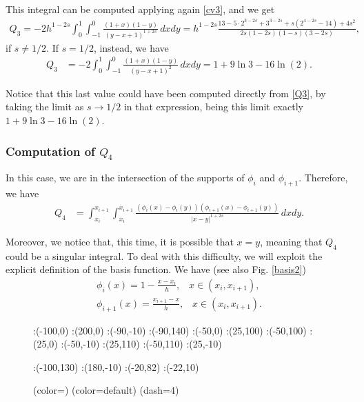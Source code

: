 {This integral can be computed applying again \eqref{cv3}, and we get
\begin{align}\label{Q3}
	Q_3 = -2h^{1-2s}\int_0^1\int_{-1}^0 \frac{(1+x)(1-y)}{(y-x+1)^{1+2s}}\,dxdy = h^{1-2s}\frac{13-5\cdot 2^{3-2s}+3^{3-2s}+s(2^{4-2s}-14)+4s^2}{2s(1-2s)(1-s)(3-2s)},
\end{align}
if $s\neq 1/2$. If $s=1/2$, instead, we have 
\begin{align*}
	Q_3 &= -2\int_0^1\int_{-1}^0 \frac{(1+x)(1-y)}{(y-x+1)^2}\,dxdy = 1+9\ln 3-16\ln(2).
\end{align*}

Notice that this last value could have been computed directly from \eqref{Q3}, by taking the limit as $s\to 1/2$ in that expression, being this limit exactly $1+9\ln 3-16\ln(2)$.

\subsubsection*{Computation of $Q_4$}
In this case, we are in the intersection of the supports of $\phi_i$ and $\phi_{i+1}$. Therefore, we have
\begin{align*}
	Q_4 &= \int_{x_i}^{x_{i+1}}\int_{x_i}^{x_{i+1}} \frac{(\phi_i(x)-\phi_i(y))(\phi_{i+1}(x)-\phi_{i+1}(y))}{|x-y|^{1+2s}}\,dxdy. 
\end{align*}

Moreover, we notice that, this time, it is possible that $x=y$, meaning that $Q_4$ could be a singular integral. To deal with this difficulty, we will exploit the explicit definition of the basis function. We have (see also Fig. \ref{basis2})
\begin{align*}
	\phi_i(x) = 1-\frac{x-x_i}{h}, \;\;\; x\in (x_i,x_{i+1}),
	\\
	\phi_{i+1}(x) = \frac{x_{i+1}-x}{h}, \;\;\; x\in (x_i,x_{i+1}).
\end{align*}
\begin{figure}[h]
\figinit{0.8pt}
:(-100,0) :(200,0)
:(-90,-10) :(-90,140)
:(-50,0) :(25,100) 
:(-50,100) :(25,0)
%
:(-50,-10) :(25,110) 
:(-50,110) :(25,-10)

:(-100,130) :(180,-10)
:(-20,82) :(-22,10)

\figdrawbegin{}
\figdrawarrow[1,2]
\figset (color=\Redrgb)
\figdrawline[3,4]
\figset (color=default)
\figdrawline[5,6]
\figset(dash=4)
\figdrawline[4,6]
\figdrawarrow[11,12]
\figdrawline[3,5]
\figdrawend


\end{figure}}

